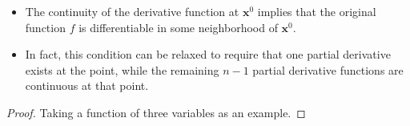 \documentclass[11pt]{elegantbook}
\begin{document}
\begin{note}
    \begin{itemize}
        \item The continuity of the derivative function at \(\mathbf{x}^{0}\) implies that 
            the original function \(f\) is differentiable in some neighborhood of \(\mathbf{x}^{0}\).
        \item In fact, this condition can be relaxed to require that one partial derivative exists at the point, 
            while the remaining \(n-1\) partial derivative functions are continuous at that point.
    \end{itemize}
\end{note}

\begin{proof}
    Taking a function of three variables as an example.


\end{proof}
\end{document}

